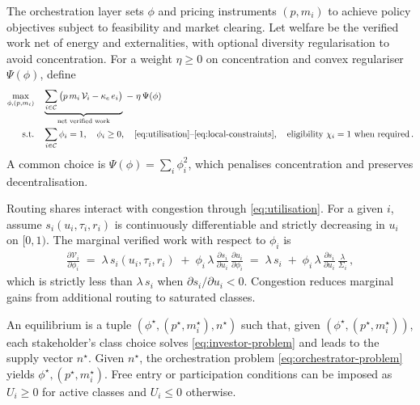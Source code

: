 \documentclass[oneside,10pt]{swissi}
\begin{document}
The orchestration layer sets \(\phi\) and pricing instruments \((p,m_i)\) to achieve policy objectives subject to feasibility and market clearing. Let welfare be the verified work net of energy and externalities, with optional diversity regularisation to avoid concentration. For a weight \(\eta\ge 0\) on concentration and convex regulariser \(\Psi(\phi)\), define
\begin{align}
\max_{\phi,(p,m_i)}\quad & \underbrace{\sum_{i\in\mathcal{C}} \big(p\,m_i\,\mathcal{V}_i - \kappa_e\,e_i \big)}_{\text{net verified work}} \;-\; \eta\,\Psi(\phi) \\
\text{s.t.}\quad & \sum_{i\in\mathcal{C}}\phi_i = 1,\quad \phi_i \ge 0,\quad \text{\eqref{eq:utilisation}\text{--}\eqref{eq:local-constraints}},\quad \text{eligibility } \chi_i=1\ \text{when required}\,.
\label{eq:orchestrator-problem}
\end{align}
A common choice is \(\Psi(\phi)=\sum_{i}\phi_i^2\), which penalises concentration and preserves decentralisation.

Routing shares interact with congestion through \eqref{eq:utilisation}. For a given \(i\), assume \(s_i(u_i,\tau_i,r_i)\) is continuously differentiable and strictly decreasing in \(u_i\) on \([0,1)\). The marginal verified work with respect to \(\phi_i\) is
\begin{align}
\frac{\partial \mathcal{V}_i}{\partial \phi_i}
\;=\; \lambda\,s_i(u_i,\tau_i,r_i) \;+\; \phi_i\,\lambda\,\frac{\partial s_i}{\partial u_i}\,\frac{\partial u_i}{\partial \phi_i}
\;=\; \lambda\,s_i \;+\; \phi_i\,\lambda\,\frac{\partial s_i}{\partial u_i}\,\frac{\lambda}{\Sigma_i}\,,
\label{eq:marginal-verified}
\end{align}
which is strictly less than \(\lambda\,s_i\) when \(\partial s_i/\partial u_i<0\). Congestion reduces marginal gains from additional routing to saturated classes.

An equilibrium is a tuple \((\phi^\star,(p^\star,m^\star_i),n^\star)\) such that, given \((\phi^\star,(p^\star,m^\star_i))\), each stakeholder’s class choice solves \eqref{eq:investor-problem} and leads to the supply vector \(n^\star\). Given \(n^\star\), the orchestration problem \eqref{eq:orchestrator-problem} yields \(\phi^\star,(p^\star,m^\star_i)\). Free entry or participation conditions can be imposed as \(U_i\ge 0\) for active classes and \(U_i\le 0\) otherwise.
\end{document}
